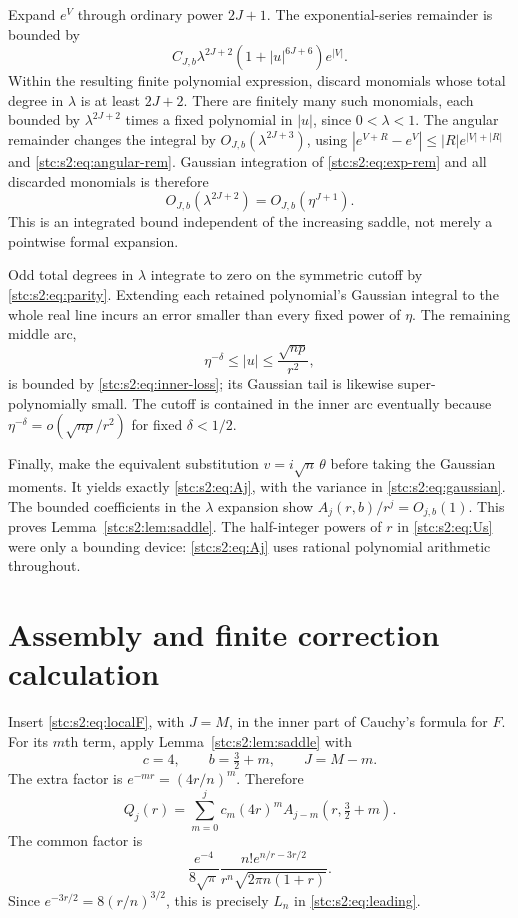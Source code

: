 \documentclass[11pt,letterpaper]{article}
\numberwithin{equation}{section}
\theoremstyle{remark}\newtheorem{remark}[theorem]{Remark}
\begin{document}
Expand $e^V$ through ordinary power $2J+1$. The exponential-series remainder is bounded by
\begin{equation}\label{stc:s2:eq:exp-rem}
 C_{J,b}\lambda^{2J+2}(1+|u|^{6J+6})e^{|V|}.
\end{equation}
Within the resulting finite polynomial expression, discard monomials whose total degree in $\lambda$ is at least $2J+2$. There are finitely many such monomials, each bounded by $\lambda^{2J+2}$ times a fixed polynomial in $|u|$, since $0<\lambda<1$. The angular remainder changes the integral by $O_{J,b}(\lambda^{2J+3})$, using $|e^{V+R}-e^V|\le |R|e^{|V|+|R|}$ and \eqref{stc:s2:eq:angular-rem}. Gaussian integration of \eqref{stc:s2:eq:exp-rem} and all discarded monomials is therefore
\begin{equation}\label{stc:s2:eq:integrated-error}
 O_{J,b}(\lambda^{2J+2})=O_{J,b}(\eta^{J+1}).
\end{equation}
This is an integrated bound independent of the increasing saddle, not merely a pointwise formal expansion.

Odd total degrees in $\lambda$ integrate to zero on the symmetric cutoff by \eqref{stc:s2:eq:parity}. Extending each retained polynomial's Gaussian integral to the whole real line incurs an error smaller than every fixed power of $\eta$. The remaining middle arc,
\[
 \eta^{-\delta}\le |u|\le\frac{\sqrt{np}}{r^2},
\]
is bounded by \eqref{stc:s2:eq:inner-loss}; its Gaussian tail is likewise super-polynomially small. The cutoff is contained in the inner arc eventually because $\eta^{-\delta}=o(\sqrt{np}/r^2)$ for fixed $\delta<1/2$.

Finally, make the equivalent substitution $v=i\sqrt n\,\theta$ before taking the Gaussian moments. It yields exactly \eqref{stc:s2:eq:Aj}, with the variance in \eqref{stc:s2:eq:gaussian}. The bounded coefficients in the $\lambda$ expansion show $A_j(r,b)/r^j=O_{j,b}(1)$. This proves Lemma~\ref{stc:s2:lem:saddle}. The half-integer powers of $r$ in \eqref{stc:s2:eq:Us} were only a bounding device: \eqref{stc:s2:eq:Aj} uses rational polynomial arithmetic throughout.

\section{Assembly and finite correction calculation}\label{stc:s2:sec:assembly}
Insert \eqref{stc:s2:eq:localF}, with $J=M$, in the inner part of Cauchy's formula for $F$. For its $m$th term, apply Lemma~\ref{stc:s2:lem:saddle} with
\[
 c=4,\qquad b=\tfrac32+m,\qquad J=M-m.
\]
The extra factor is $e^{-mr}=(4r/n)^m$. Therefore
\begin{equation}\label{stc:s2:eq:Qformula}
 Q_j(r)=\sum_{m=0}^jc_m(4r)^m A_{j-m}(r,\tfrac32+m).
\end{equation}
The common factor is
\[
 \frac{e^{-4}}{8\sqrt\pi}
 \frac{n!e^{n/r-3r/2}}{r^n\sqrt{2\pi n(1+r)}}.
\]
Since $e^{-3r/2}=8(r/n)^{3/2}$, this is precisely $L_n$ in \eqref{stc:s2:eq:leading}.
\end{document}

